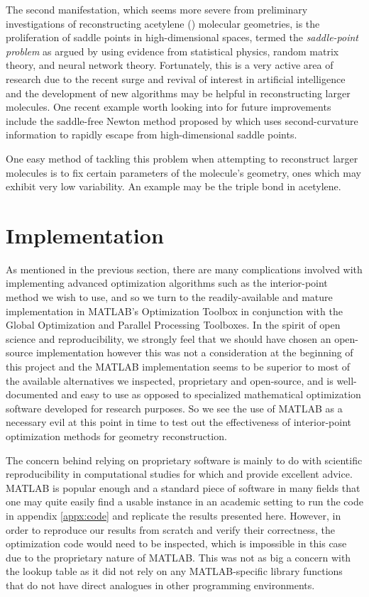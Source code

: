 The second manifestation, which seems more severe from preliminary investigations of reconstructing acetylene () molecular geometries, is the proliferation of saddle points in high-dimensional spaces, termed the \emph{saddle-point problem} as argued by \citet{Pascanu14} using evidence from statistical physics, random matrix theory, and neural network theory. Fortunately, this is a very active area of research due to the recent surge and revival of interest in artificial intelligence \citep{Bengio16,LeCun15} and the development of new algorithms may be helpful in reconstructing larger molecules. One recent example worth looking into for future improvements include the saddle-free Newton method proposed by \citet{Dauphin14} which uses second-curvature information to rapidly escape from high-dimensional saddle points.

One easy method of tackling this problem when attempting to reconstruct larger molecules is to fix certain parameters of the molecule's geometry, ones which may exhibit very low variability. An example may be the triple  bond in acetylene.

\section{Implementation} \label{sec:optImplementation}
As mentioned in the previous section, there are many complications involved with implementing advanced optimization algorithms such as the interior-point method we wish to use, and so we turn to the readily-available and mature implementation in MATLAB's Optimization Toolbox in conjunction with the Global Optimization and Parallel Processing Toolboxes. In the spirit of open science and reproducibility, we strongly feel that we should have chosen an open-source implementation however this was not a consideration at the beginning of this project and the MATLAB implementation seems to be superior to most of the available alternatives we inspected, proprietary and open-source, and is well-documented and easy to use as opposed to specialized mathematical optimization software developed for research purposes. So we see the use of MATLAB as a necessary evil at this point in time to test out the effectiveness of interior-point optimization methods for geometry reconstruction.

The concern behind relying on proprietary software is mainly to do with scientific reproducibility in computational studies \citep{Easterbrook14} for which \citet{Millman14} and \citet{Wilson14} provide excellent advice. MATLAB is popular enough and a standard piece of software in many fields that one may quite easily find a usable instance in an academic setting to run the code in appendix \ref{appx:code} and replicate the results presented here. However, in order to reproduce our results from scratch and verify their correctness, the optimization code would need to be inspected, which is impossible in this case due to the proprietary nature of MATLAB. This was not as big a concern with the lookup table as it did not rely on any MATLAB-specific library functions that do not have direct analogues in other programming environments.

